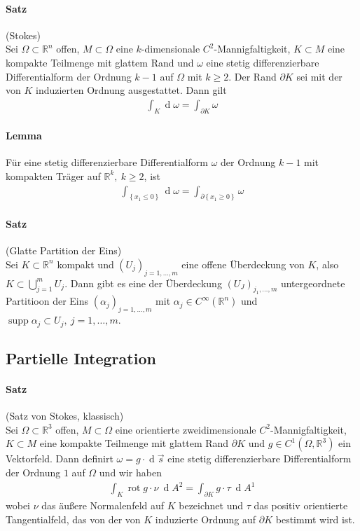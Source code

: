 \documentclass[12pt,a4paper,fleqn]{article}
\def\set#1{{\left\{ #1 \right\}}}
\def\R{{\mathbb{R}}}
\def\d{{\operatorname{d}}}
\begin{document}
\paragraph{Satz} (Stokes)\\
Sei $\Omega\subset\R^n$ offen, $M\subset\Omega$ eine $k$-dimensionale $C^2$-Mannigfaltigkeit, $K\subset M$ eine kompakte Teilmenge mit glattem Rand und $\omega$ eine stetig differenzierbare Differentialform der Ordnung $k-1$ auf $\Omega$ mit $k\geq 2$. Der Rand $\partial K$ sei mit der von $K$ induzierten Ordnung ausgestattet. Dann gilt
\begin{align*}
\int_K \d\omega = \int_{\partial K} \omega
\end{align*}

\paragraph{Lemma} Für eine stetig differenzierbare Differentialform $\omega$ der Ordnung $k-1$ mit kompakten Träger auf $\R^k,\ k\geq 2$, ist 
\begin{align*}
\int_{\set{x_1\leq 0}} \d \omega = \int_{\partial \set{x_1 \geq 0}} \omega
\end{align*}

\paragraph{Satz} (Glatte Partition der Eins)\\
Sei $K\subset \R^n$ kompakt und $(U_j)_{j=1, \dotsc, m}$ eine offene Überdeckung von $K$, also ${K\subset\bigcup_{j=1}^m U_j}$. Dann gibt es eine der Überdeckung $(U_J)_{j_1, \dotsc, m}$ untergeordnete Partitioon der Eins $(\alpha_j)_{j=1, \dotsc, m}$ mit $\alpha_j \in C^\infty(\R^n)$ und $\operatorname{supp} \alpha_j \subset U_j,\ j=1, \dotsc, m$.

\subsection{Partielle Integration}

\paragraph{Satz} (Satz von Stokes, klassisch)\\
Sei $\Omega\subset\R^3$ offen, $M\subset \Omega$ eine orientierte zweidimensionale $C^2$-Mannigfaltigkeit, $K\subset M$ eine kompakte Teilmenge mit glattem Rand $\partial K$ und $g\in C^1(\Omega, \R^3)$ ein Vektorfeld. Dann definirt $\omega=g\cdot\d \overrightarrow{s}$ eine stetig differenzierbare Differentialform der Ordnung $1$ auf $\Omega$ und wir haben
\begin{align*}
\int_K \operatorname{rot} g \cdot \nu\ \d A^2 = \int_{\partial K} g \cdot \tau\ \d A^1
\end{align*}
wobei $\nu$ das äußere Normalenfeld auf $K$ bezeichnet und $\tau$ das positiv orientierte Tangentialfeld, das von der von $K$ induzierte Ordnung auf $\partial K$ bestimmt wird ist.
\end{document}

